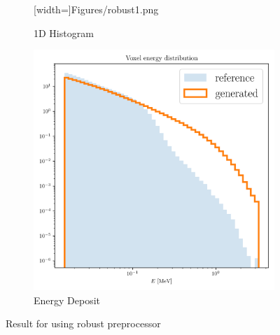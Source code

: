 \begin{figure}[htbp]
\begin{subfigure}[b]{0.3\textwidth}
        [width=\textwidth]{Figures/robust1.png}
        \caption{1D Histogram}
        \label{fig:robust1}
    \end{subfigure}
    \hfill
    \begin{subfigure}[b]{0.3\textwidth}
        \centering
        \includegraphics[width=\textwidth]{Figures/robust6.png}
        \caption{Energy Deposit}
        \label{fig:robust6}
    \end{subfigure}
    \caption{Result for using robust preprocessor}
\end{figure}

